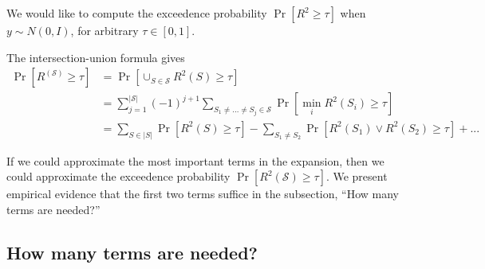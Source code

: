 \documentclass[12pt]{article}
\begin{document}
We would like to compute the exceedence probability
$\Pr[R^2 \geq \tau]$ when $y \sim N(0, I)$, for arbitrary $\tau \in
[0, 1]$.

The intersection-union formula gives
\begin{align*}
\Pr[R^(\mathcal{S}) \geq \tau] &= \Pr[\cup_{S \in \mathcal{S}} R^2(S) \geq \tau] 
\\&= \sum_{j=1}^{|\mathcal{S}|} (-1)^{j+1} \sum_{S_1 \neq ... \neq S_j \in \mathcal{S}} \Pr[\min_i R^2(S_i) \geq \tau] 
\\&= \sum_{S \in |S|} \Pr[R^2(S) \geq \tau] - \sum_{S_1 \neq S_2} \Pr[R^2(S_1)\vee R^2(S_2) \geq \tau] + ...
\end{align*}

If we could approximate the most important terms in the expansion,
then we could approximate the exceedence probability
$\Pr[R^2(\mathcal{S}) \geq \tau]$.  We present empirical evidence that
the first two terms suffice in the subsection, ``How many terms are
needed?''

\subsection{How many terms are needed?}
\end{document}

